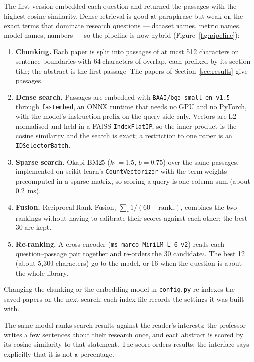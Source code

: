 \documentclass[11pt,a4paper]{article}
\newcommand{\code}[1]{\texttt{#1}}
\begin{document}
The first version embedded each question and returned the passages with the highest cosine similarity.
Dense retrieval is good at paraphrase but weak on the exact terms that dominate research questions ---
dataset names, metric names, model names, numbers --- so the pipeline is now hybrid (Figure~\ref{fig:pipeline}):
\begin{enumerate}
\item \textbf{Chunking.} Each paper is split into passages of at most 512 characters on sentence boundaries
  with 64 characters of overlap, each prefixed by its section title; the abstract is the first passage.
  The \mPapers{} papers of Section~\ref{sec:results} give \mPassages{} passages.
\item \textbf{Dense search.} Passages are embedded with \code{BAAI/bge-small-en-v1.5} through
  \code{fastembed}, an ONNX runtime that needs no GPU and no PyTorch, with the model's instruction prefix on
  the query side only. Vectors are L2-normalised and held in a FAISS \code{IndexFlatIP}, so the inner product
  is the cosine similarity and the search is exact; a restriction to one paper is an \code{IDSelectorBatch}.
\item \textbf{Sparse search.} Okapi BM25 ($k_1=1.5$, $b=0.75$) over the same passages, implemented on
  scikit-learn's \code{CountVectorizer} with the term weights precomputed in a sparse matrix, so scoring a
  query is one column sum (about 0.2~ms).
\item \textbf{Fusion.} Reciprocal Rank Fusion, $\sum_r 1/(60+\mathrm{rank}_r)$, combines the two rankings
  without having to calibrate their scores against each other; the best 30 are kept.
\item \textbf{Re-ranking.} A cross-encoder (\code{ms-marco-MiniLM-L-6-v2}) reads each question--passage
  pair together and re-orders the 30 candidates. The best 12 (about 5,300 characters) go to the model, or
  16 when the question is about the whole library.
\end{enumerate}
Changing the chunking or the embedding model in \code{config.py} re-indexes the saved papers on the next
search: each index file records the settings it was built with.

The same model ranks search results against the reader's interests: the professor writes a few sentences
about their research once, and each abstract is scored by its cosine similarity to that statement. The
score orders results; the interface says explicitly that it is not a percentage.

\end{document}
